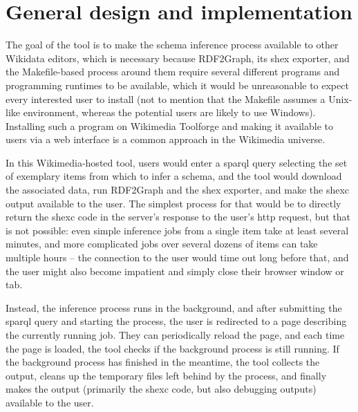 \section{General design and implementation}
\label{sec:wdsi:abstract}

The goal of the tool is to make the \gls{schema} inference process available to other \gls{Wikidata} editors,
which is necessary because \gls{RDF2Graph}, its \gls{shex} exporter, and the Makefile-based process around them
require several different programs and programming runtimes to be available,
which it would be unreasonable to expect every interested user to install
(not to mention that the Makefile assumes a Unix-like environment,
whereas the potential users are likely to use Windows).
Installing such a program on Wikimedia Toolforge
and making it available to users via a web interface
is a common approach in the Wikimedia universe.

In this Wikimedia-hosted tool,
users would enter a \gls{sparql} query selecting the set of exemplary \glspl{item} from which to infer a \gls{schema},
and the tool would download the associated data,
run \gls{RDF2Graph} and the \gls{shex} exporter,
and make the \gls{shexc} output available to the user.
The simplest process for that would be
to directly return the \gls{shexc} code in the server’s response to the user’s \gls{http} request,
but that is not possible:
even simple inference jobs %
from a single \gls{item} take at least several minutes,
and more complicated jobs %
over several dozens of \glspl{item} can take multiple hours –
the connection to the user would time out long before that,
and the user might also become impatient and simply close their browser window or tab.

Instead, the inference process runs in the background,
and after submitting the \gls{sparql} query and starting the process,
the user is redirected to a page describing the currently running job.
They can periodically reload the page,
and each time the page is loaded,
the tool checks if the background process is still running.
If the background process has finished in the meantime,
the tool collects the output,
cleans up the temporary files left behind by the process,
and finally makes the output
(primarily the \gls{shexc} code, but also debugging outputs)
available to the user.

